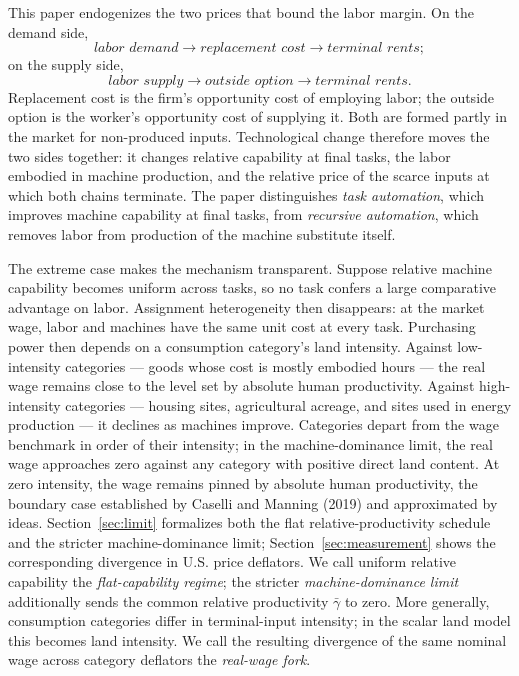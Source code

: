 \documentclass[12pt]{article}
\theoremstyle{plain}
\begin{document}
This paper endogenizes the two prices that bound the labor margin. On the demand side,
\[
\textit{labor demand} \to \textit{replacement cost} \to \textit{terminal rents};
\]
on the supply side,
\[
\textit{labor supply} \to \textit{outside option} \to \textit{terminal rents}.
\]
Replacement cost is the firm's opportunity cost of employing labor; the outside option is the worker's opportunity cost of supplying it. Both are formed partly in the market for non-produced inputs. Technological change therefore moves the two sides together: it changes relative capability at final tasks, the labor embodied in machine production, and the relative price of the scarce inputs at which both chains terminate. The paper distinguishes \emph{task automation}, which improves machine capability at final tasks, from \emph{recursive automation}, which removes labor from production of the machine substitute itself.

The extreme case makes the mechanism transparent. Suppose relative machine capability becomes uniform across tasks, so no task confers a large comparative advantage on labor. Assignment heterogeneity then disappears: at the market wage, labor and machines have the same unit cost at every task. Purchasing power then depends on a consumption category's land intensity. Against low-intensity categories --- goods whose cost is mostly embodied hours --- the real wage remains close to the level set by absolute human productivity. Against high-intensity categories --- housing sites, agricultural acreage, and sites used in energy production --- it declines as machines improve. Categories depart from the wage benchmark in order of their intensity; in the machine-dominance limit, the real wage approaches zero against any category with positive direct land content. At zero intensity, the wage remains pinned by absolute human productivity, the boundary case established by Caselli and Manning (2019) and approximated by ideas. Section~\ref{sec:limit} formalizes both the flat relative-productivity schedule and the stricter machine-dominance limit; Section~\ref{sec:measurement} shows the corresponding divergence in U.S. price deflators. We call uniform relative capability the \emph{flat-capability regime}; the stricter \emph{machine-dominance limit} additionally sends the common relative productivity $\bar\gamma$ to zero. More generally, consumption categories differ in terminal-input intensity; in the scalar land model this becomes land intensity. We call the resulting divergence of the same nominal wage across category deflators the \emph{real-wage fork}.
\end{document}
